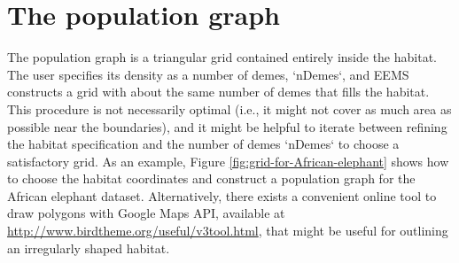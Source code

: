 \documentclass[a4paper,10pt,DIV=15,mpinclude=true]{scrartcl}
\begin{document}

\section{The population graph}

The population graph is a triangular grid contained entirely inside the habitat. The user specifies its density as a number of demes, `nDemes`, and EEMS constructs a grid with about the same number of demes that fills the habitat. This procedure is not necessarily optimal (i.e., it might not cover as much area as possible near the boundaries), and it might be helpful to iterate between refining the habitat specification and the number of demes `nDemes` to choose a satisfactory grid. As an example, Figure \ref{fig:grid-for-African-elephant} shows how to choose the habitat coordinates and construct a population graph for the African elephant dataset. Alternatively, there exists a convenient online tool to draw polygons with Google Maps API, available at \url{http://www.birdtheme.org/useful/v3tool.html}, that might be useful for outlining an irregularly shaped habitat.
\end{document}
